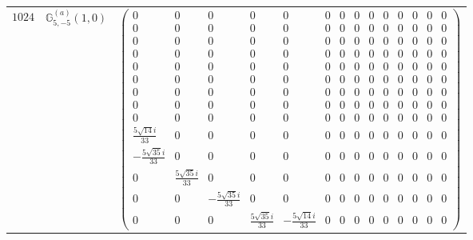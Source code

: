 \documentclass[fleqn,8pt,landscape]{jsarticle}
\begin{document}
\begin{center}
\begin{longtable}{ccc}
$ 1024 $ & $ \mathbb{G}_{5,-5}^{(a)}(1,0) $ & $ \begin{pmatrix} 0 & 0 & 0 & 0 & 0 & 0 & 0 & 0 & 0 & 0 & 0 & 0 & 0 & 0 \\ 0 & 0 & 0 & 0 & 0 & 0 & 0 & 0 & 0 & 0 & 0 & 0 & 0 & 0 \\ 0 & 0 & 0 & 0 & 0 & 0 & 0 & 0 & 0 & 0 & 0 & 0 & 0 & 0 \\ 0 & 0 & 0 & 0 & 0 & 0 & 0 & 0 & 0 & 0 & 0 & 0 & 0 & 0 \\ 0 & 0 & 0 & 0 & 0 & 0 & 0 & 0 & 0 & 0 & 0 & 0 & 0 & 0 \\ 0 & 0 & 0 & 0 & 0 & 0 & 0 & 0 & 0 & 0 & 0 & 0 & 0 & 0 \\ 0 & 0 & 0 & 0 & 0 & 0 & 0 & 0 & 0 & 0 & 0 & 0 & 0 & 0 \\ 0 & 0 & 0 & 0 & 0 & 0 & 0 & 0 & 0 & 0 & 0 & 0 & 0 & 0 \\ 0 & 0 & 0 & 0 & 0 & 0 & 0 & 0 & 0 & 0 & 0 & 0 & 0 & 0 \\ \frac{5 \sqrt{14} i}{33} & 0 & 0 & 0 & 0 & 0 & 0 & 0 & 0 & 0 & 0 & 0 & 0 & 0 \\ - \frac{5 \sqrt{35} i}{33} & 0 & 0 & 0 & 0 & 0 & 0 & 0 & 0 & 0 & 0 & 0 & 0 & 0 \\ 0 & \frac{5 \sqrt{35} i}{33} & 0 & 0 & 0 & 0 & 0 & 0 & 0 & 0 & 0 & 0 & 0 & 0 \\ 0 & 0 & - \frac{5 \sqrt{35} i}{33} & 0 & 0 & 0 & 0 & 0 & 0 & 0 & 0 & 0 & 0 & 0 \\ 0 & 0 & 0 & \frac{5 \sqrt{35} i}{33} & - \frac{5 \sqrt{14} i}{33} & 0 & 0 & 0 & 0 & 0 & 0 & 0 & 0 & 0 \end{pmatrix} $ \\
\end{longtable}
\end{center}
\end{document}
